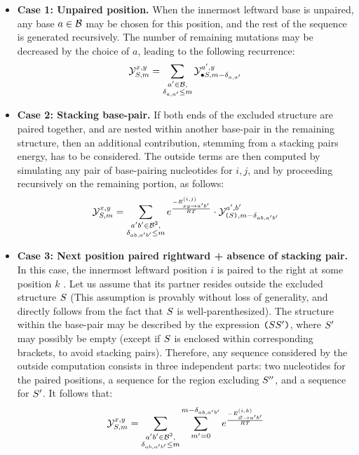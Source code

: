 \begin{itemize}
\item {\bf Case 1: Unpaired position.} When the innermost leftward base is unpaired, any base $a\in\mathcal{B}$ may be chosen for this position, and the rest of the sequence is generated recursively. The number of remaining mutations may be decreased by the choice of $a$, leading to the following recurrence:
\begin{equation}
	\mathcal{Y}_{S, m}^{x,y} = \sum_{\substack{a'\in \mathcal{B},\\ \delta_{a,a'}\le m}}
    \mathcal{Y}_{\bullet S, m- \delta_{a,a'}}^{a',y}
\label{eq:Y_rec_A}
\end{equation}
\item {\bf Case 2: Stacking base-pair.} If both ends of the excluded structure are paired together, and are nested within another base-pair in the remaining structure, then an additional contribution, stemming from a stacking pairs energy, has to be considered. The outside terms are then computed by simulating any pair of base-pairing nucleotides for $i,j$, and by proceeding recursively on the remaining portion, as follows:
\begin{equation}
	\mathcal{Y}_{S, m}^{x,y} = 
    \sum_{\substack{a'b'\in \mathcal{B}^2,\\ \delta_{ab,a'b'}\le m}}
		 e^{\frac{-E^{(i,j)}_{{xy}\to{a'b'}}}{RT}}\cdot
    \mathcal{Y}_{\text{\tt(}S\text{\tt )}, m- \delta_{ab,a'b'}}^{a',b'} 
\label{eq:Y_rec_B}
\end{equation}
\item {\bf Case 3: Next position paired rightward + absence of stacking pair.} In this case, the innermost leftward position $i$ is paired to the right at some position $k$ . 
Let us assume that its partner resides outside the excluded structure $S$ (This assumption is provably without loss of generality, and directly follows from the fact that $S$ is well-parenthesized). 
The structure within the base-pair may be described by the expression $\text{\tt(}S S'\text{\tt )}$, where $S'$ may possibly be empty (except if $S$ is enclosed within corresponding brackets, to avoid stacking pairs). Therefore, any sequence considered by the outside computation consists in three independent parts: two nucleotides for the paired positions, a sequence for the region excluding $S''$, and a sequence for $S'$. It follows that:
\begin{equation}
	\Y{\Struct}{m}{x,y} = \sum_{\substack{a'b'\in \B^2,\\ \Kron_{ab,a'b'}\le m}}
		 \sum_{m'=0}^{m-\Kron_{ab,a'b'}}
  		 e^{\frac{-\EBP{i,k}{\varnothing}{a'b'}}{RT}}

\end{equation}
\end{itemize}
